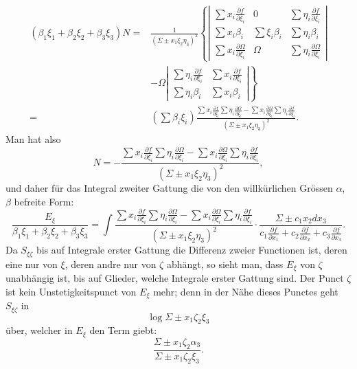 \documentclass[10pt]{article}
\begin{document}
\[
\begin{aligned}
(\beta_1\xi_1+\beta_2\xi_2+\beta_3\xi_3)N
={}&\frac{1}{(\Sigma\pm x_1\xi_2\eta_3)^2}
\left\{
\left|\begin{array}{ccc}
\sum x_i\frac{\partial f}{\partial \xi_i}&0&\sum \eta_i\frac{\partial f}{\partial \xi_i}\\
\sum x_i\beta_i&\sum \xi_i\beta_i&\sum \eta_i\beta_i\\
\sum x_i\frac{\partial\Omega}{\partial \xi_i}&\Omega&\sum \eta_i\frac{\partial\Omega}{\partial \xi_i}
\end{array}\right|
\right.\\
&\left.
-\Omega
\left|\begin{array}{cc}
\sum \eta_i\frac{\partial f}{\partial \xi_i}&\sum x_i\frac{\partial f}{\partial \xi_i}\\
\sum \eta_i\beta_i&\sum x_i\beta_i
\end{array}\right|
\right\}\\
={}&(\sum\beta_i\xi_i)
\frac{\sum x_i\frac{\partial f}{\partial \xi_i}\sum \eta_i\frac{\partial\Omega}{\partial \xi_i}
-\sum x_i\frac{\partial\Omega}{\partial \xi_i}\sum \eta_i\frac{\partial f}{\partial \xi_i}}{(\Sigma\pm x_1\xi_2\eta_3)^2}.
\end{aligned}
\]
Man hat also
\[
N=-\frac{\sum x_i\frac{\partial f}{\partial \xi_i}\sum \eta_i\frac{\partial\Omega}{\partial \xi_i}
-\sum x_i\frac{\partial\Omega}{\partial \xi_i}\sum \eta_i\frac{\partial f}{\partial \xi_i}}{(\Sigma\pm x_1\xi_2\eta_3)^2},
\]
und daher für das Integral zweiter Gattung die von den willkürlichen Grössen $\alpha$, $\beta$ befreite Form:
\[
\frac{E_\xi}{\beta_1\xi_1+\beta_2\xi_2+\beta_3\xi_3}=\int
\frac{\sum x_i\frac{\partial f}{\partial \xi_i}\sum \eta_i\frac{\partial\Omega}{\partial \xi_i}
-\sum x_i\frac{\partial\Omega}{\partial \xi_i}\sum \eta_i\frac{\partial f}{\partial \xi_i}}{(\Sigma\pm x_1\xi_2\eta_3)^2}
\cdot
\frac{\Sigma\pm c_1x_2dx_3}{c_1\frac{\partial f}{\partial x_1}+c_2\frac{\partial f}{\partial x_2}+c_3\frac{\partial f}{\partial x_3}}.
\]
Da $S_{\xi\zeta}$ bis auf Integrale erster Gattung die Differenz zweier Functionen ist, deren eine nur von $\xi$, deren andre nur von $\zeta$ abhängt, so sieht man, dass $E_\xi$ von $\zeta$ unabhängig ist, bis auf Glieder, welche Integrale erster Gattung sind. Der Punct $\zeta$ ist kein Unstetigkeitspunct von $E_\xi$ mehr; denn in der Nähe dieses Punctes geht $S_{\xi\zeta}$ in
\[
\log\Sigma\pm x_1\zeta_2\xi_3
\]
über, welcher in $E_\xi$ den Term giebt:
\[
\frac{\Sigma\pm x_1\zeta_2\alpha_3}{\Sigma\pm x_1\zeta_2\xi_3}.
\]
\end{document}
